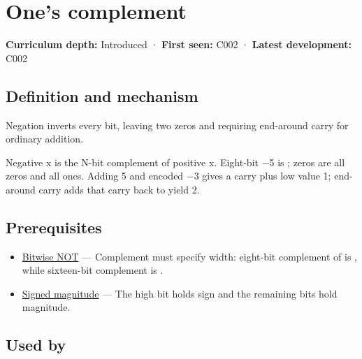 \hypertarget{appendix-03c678cd40b3}{}\label{referencestart:appendix-03c678cd40b3}
\section{One's complement}\label{appendix-03c678cd40b3-ones-complement}

\hypertarget{appendix-03c678cd40b3-ones-complement}{}

\textbf{Curriculum depth:} Introduced · \textbf{First seen:} C002 · \textbf{Latest development:} C002

\begin{allmightroledefinition}

\subsection{Definition and mechanism}\label{appendix-03c678cd40b3-definition-and-mechanism}

\hypertarget{appendix-03c678cd40b3-definition-and-mechanism}{}

Negation inverts every bit, leaving two zeros and requiring end-around carry for ordinary addition.

\end{allmightroledefinition}

Negative x is the N-bit complement of positive x. Eight-bit −5 is ; zeros are all zeros and all ones. Adding 5 and encoded −3 gives a carry plus low value 1; end-around carry adds that carry back to yield 2.

\subsection{Prerequisites}\label{appendix-03c678cd40b3-prerequisites}

\hypertarget{appendix-03c678cd40b3-prerequisites}{}

\begin{itemize}
\tightlist
\item
  \hyperref[appendix-8f38927cfc54]{Bitwise NOT} --- Complement must specify width: eight-bit complement of  is , while sixteen-bit complement is .
\item
  \hyperref[appendix-ce20506c8532]{Signed magnitude} --- The high bit holds sign and the remaining bits hold magnitude.
\end{itemize}

\subsection{Used by}\label{appendix-03c678cd40b3-used-by}

